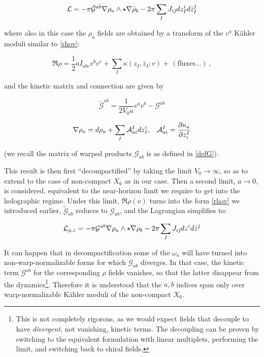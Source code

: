 \begin{equation}
	\mathcal{L} = - \pi \tilde{\mathcal{G}}^{ab} \nabla \rho_a \wedge \star \nabla \bar\rho_b - 2\pi \sum_I J_{i\bar{\jmath}} dz_I^i d\bar z_I^{\bar\jmath}
	\label{}
\end{equation}

where also in this case the $\rho_a$ fields are obtained by a transform of the $v^a$ K\"ahler moduli similar to \eqref{rhov}:

\begin{equation}
	\Re \rho  = \frac{1}{2} a I_{abc} v^b v^c + \sum_I \kappa(z_I,\bar z_I; v) + \, (\text{fluxes}\ldots) \,,
	\label{}
\end{equation}

and the kinetic matrix and connection are given by

\begin{equation}
	\tilde{\mathcal{G}}^{ab} = \frac{1}{2V_0 a} v^a v^b - \mathcal{G}^{ab}
	\label{}
\end{equation}

\begin{align}
	\nabla \rho_a = d\rho_a + \sum_I \mathcal{A}^I_{ai} dz_I^i, && \mathcal{A}^I_{ai} = \frac{\partial\kappa_a}{\partial z^I_i}
	\label{}
\end{align}

(we recall the matrix of warped products $\mathcal{G}_{ab}$ is as defined in \ref{defG}).

This result is then first ``decompactified'' by taking the limit $V_0 \rightarrow \infty$, so as to extend to the case of non-compact $X_6$ as in our case. Then a second limit, $a \rightarrow 0$, is considered, equivalent to the near-horizon limit we require to get into the holographic regime. Under this limit, $\Re \rho(v)$ turns into the form \ref{rhov} we introduced earlier, $\tilde{\mathcal{G}}_{ab}$ reduces to $\mathcal{G}_{ab}$, and the Lagrangian simplifies to:

\begin{equation}
	\mathcal{L}_{\rho,z} = - \pi \mathcal{G}^{ab} \nabla \rho_a \wedge \star \nabla \rho_b - 2\pi \sum_I J_{i\bar{\jmath}} dz^i d\bar z^{\bar\jmath}
	\label{}
\end{equation}

It can happen that in decompactification some of the $\omega_a$ will have turned into non-warp-normalizable forms for which $\mathcal{G}_{ab}$ diverges. In that case, the kinetic term $\mathcal{G}^{ab}$ for the corresponding $\rho$ fields vanishes, so that the latter disappear from the dynamics\footnote{This is not completely rigorous, as we would expect fields that decouple to have \emph{divergent}, not vanishing, kinetic terms. The decoupling can be proven\cite{MZ} by switching to the equivalent formulation with linear multiplets, performing the limit, and switching back to chiral fields.}. Therefore it is understood that the $a,b$ indices span only over warp-normalizable K\"ahler moduli of the non-compact $X_6$.

